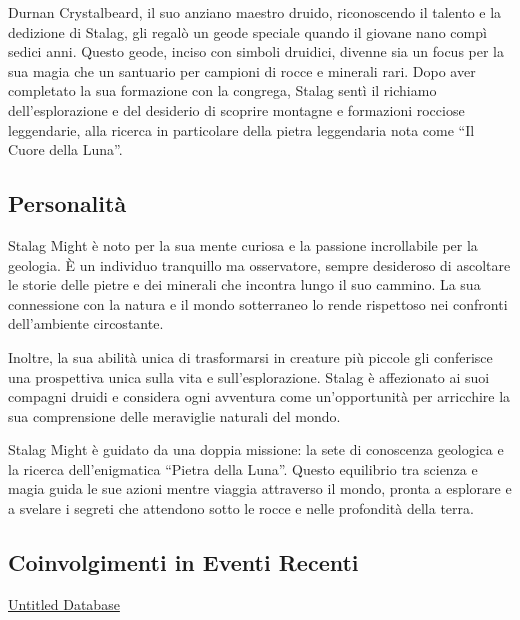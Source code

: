 Durnan Crystalbeard, il suo anziano maestro druido, riconoscendo il
talento e la dedizione di Stalag, gli regalò un geode speciale quando il
giovane nano compì sedici anni. Questo geode, inciso con simboli
druidici, divenne sia un focus per la sua magia che un santuario per
campioni di rocce e minerali rari. Dopo aver completato la sua
formazione con la congrega, Stalag sentì il richiamo dell'esplorazione e
del desiderio di scoprire montagne e formazioni rocciose leggendarie,
alla ricerca in particolare della pietra leggendaria nota come ``Il
Cuore della Luna''.

\subsection{Personalità}\label{personalituxe0}


Stalag Might è noto per la sua mente curiosa e la passione incrollabile
per la geologia. È un individuo tranquillo ma osservatore, sempre
desideroso di ascoltare le storie delle pietre e dei minerali che
incontra lungo il suo cammino. La sua connessione con la natura e il
mondo sotterraneo lo rende rispettoso nei confronti dell'ambiente
circostante.

Inoltre, la sua abilità unica di trasformarsi in creature più piccole
gli conferisce una prospettiva unica sulla vita e sull'esplorazione.
Stalag è affezionato ai suoi compagni druidi e considera ogni avventura
come un'opportunità per arricchire la sua comprensione delle meraviglie
naturali del mondo.

Stalag Might è guidato da una doppia missione: la sete di conoscenza
geologica e la ricerca dell'enigmatica ``Pietra della Luna''. Questo
equilibrio tra scienza e magia guida le sue azioni mentre viaggia
attraverso il mondo, pronta a esplorare e a svelare i segreti che
attendono sotto le rocce e nelle profondità della terra.

\subsection{Coinvolgimenti in Eventi
Recenti}\label{coinvolgimenti-in-eventi-recenti}


\href{Untitled\%20Database\%20da6a05127a584f75a0bd57df6960b00a.csv}{Untitled
Database}

